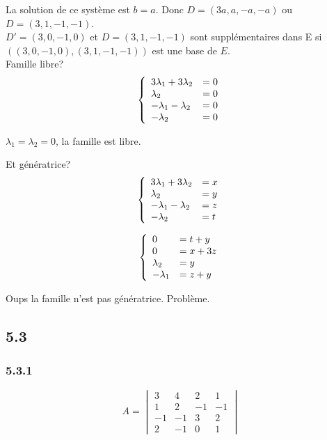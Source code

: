 \documentclass[]{book}
\theoremstyle{definition}
\begin{document}
La solution de ce syst\`eme est $b=a$. Donc $D=(3a,a,-a,-a)$ ou $D=(3,1,-1,-1)$.\\

$D'=(3,0,-1,0)$ et $D=(3,1,-1,-1)$ sont suppl\'ementaires dans E si $((3,0,-1,0),(3,1,-1,-1)) $ est une base de $E$. \\

Famille libre?
$$
\left\{ 
\begin{array}{l l}
3\lambda_1 + 3\lambda_2& = 0 \\
\lambda_2 & = 0 \\
-\lambda_1 -\lambda_2 & = 0 \\
-\lambda_2 & = 0 \\
\end{array}
\right. 
$$

$\lambda_1=\lambda_2=0$, la famille est libre. 

Et g\'en\'eratrice?
$$
\left\{ 
\begin{array}{l l}
3\lambda_1 + 3\lambda_2& = x \\
\lambda_2 & = y \\
-\lambda_1 -\lambda_2 & = z \\
-\lambda_2 & = t \\
\end{array}
\right. 
$$

$$
\left\{ 
\begin{array}{l l}
0 & = t + y\\
0 & = x +3z\\
\lambda_2 & = y \\
-\lambda_1 & = z + y \\
\end{array}
\right. 
$$

Oups la famille n'est pas g\'en\'eratrice. Probl\`eme.\\


\subsection*{5.3}	
\subsubsection*{5.3.1}	

$$
A = \begin{vmatrix} 3 & 4 & 2 & 1 \\ 1 & 2 & -1 & -1 \\  -1 & -1 & 3 & 2\\ 2 & -1 & 0 & 1 \end{vmatrix} 
$$
\end{document}
